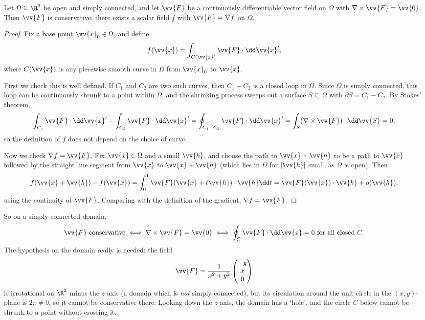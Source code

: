 \begin{theorem}
	Let $\Omega \subseteq \R^3$ be open and simply connected, and let $\vv{F}$ be a continuously differentiable vector field on $\Omega$ with $\nabla \times \vv{F} = \vv{0}$. Then $\vv{F}$ is conservative: there exists a scalar field $f$ with $\vv{F} = \nabla f$ on $\Omega$.
\end{theorem}
\begin{proof}
	Fix a base point $\vv{x}_0 \in \Omega$, and define
	$$
	f(\vv{x}) = \int_{C(\vv{x})} \vv{F} \cdot \dd \vv{x}',
	$$
	where $C(\vv{x})$ is any piecewise smooth curve in $\Omega$ from $\vv{x}_0$ to $\vv{x}$.

	First we check this is well defined. If $C_1$ and $C_2$ are two such curves, then $C_1 - C_2$ is a closed loop in $\Omega$. Since $\Omega$ is simply connected, this loop can be continuously shrunk to a point within $\Omega$, and the shrinking process sweeps out a surface $S \subseteq \Omega$ with $\partial S = C_1 - C_2$. By Stokes' theorem,
	$$
	\int_{C_1} \vv{F} \cdot \dd \vv{x}' - \int_{C_2} \vv{F} \cdot \dd \vv{x}' = \oint_{C_1 - C_2} \vv{F} \cdot \dd \vv{x}' = \int_S (\nabla \times \vv{F}) \cdot \dd \vv{S} = 0,
	$$
	so the definition of $f$ does not depend on the choice of curve.

	Now we check $\nabla f = \vv{F}$. Fix $\vv{x} \in \Omega$ and a small $\vv{h}$, and choose the path to $\vv{x} + \vv{h}$ to be a path to $\vv{x}$ followed by the straight line segment from $\vv{x}$ to $\vv{x} + \vv{h}$ (which lies in $\Omega$ for $|\vv{h}|$ small, as $\Omega$ is open). Then
	$$
	f(\vv{x} + \vv{h}) - f(\vv{x}) = \int_0^1 \vv{F}(\vv{x} + t \vv{h}) \cdot \vv{h} \dd t = \vv{F}(\vv{x}) \cdot \vv{h} + o(\vv{h}),
	$$
	using the continuity of $\vv{F}$. Comparing with the definition of the gradient, $\nabla f = \vv{F}$.
\end{proof}

So on a simply connected domain,
$$
\vv{F} \text{ conservative} \iff \nabla \times \vv{F} = \vv{0} \iff \oint_C \vv{F} \cdot \dd \vv{x} = 0 \text{ for all closed } C.
$$
The hypothesis on the domain really is needed: the field
$$
\vv{F} = \frac{1}{x^2 + y^2}\begin{pmatrix}
	-y \\ x \\ 0
\end{pmatrix}
$$
is irrotational on $\R^3$ minus the $z$-axis (a domain which is \emph{not} simply connected), but its circulation around the unit circle in the $(x, y)$-plane is $2 \pi \neq 0$, so it cannot be conservative there. Looking down the $z$-axis, the domain has a `hole', and the circle $C$ below cannot be shrunk to a point without crossing it.

